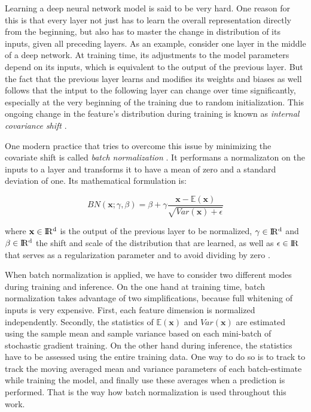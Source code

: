 Learning a deep neural network model is said to be very hard. One reason for this is that every layer not just has to learn the overall representation directly from the beginning, but also has to master the change in distribution of its inputs, given all preceding layers. As an example, consider one layer in the middle of a deep network. At training time, its adjustments to the model parameters depend on its inputs, which is equivalent to the output of the previous layer. But the fact that the previous layer learns and modifies its weights and biases as well follows that the intput to the following layer can change over time significantly, especially at the very beginning of the training due to random initialization. This ongoing change in the feature's distribution during training is known as \textit{internal covariance shift} \parencite{rnn-batchnorm}.

One modern practice that tries to overcome this issue by minimizing the covariate shift is called \textit{batch normalization} \parencite{batchnorm}. It performans a normalizaton on the inputs to a layer and transforms it to have a mean of zero and a standard deviation of one. Its mathematical formulation is:

\begin{equation} \label{eq:bn}
  BN(\textbf{x}; \gamma, \beta) = \beta + \gamma \frac{\textbf{x} - \mathbb{E}(\textbf{x})}{\sqrt{Var(\textbf{x}) + \epsilon}}
\end{equation}

where $ \textbf{x} \in \rm I\!R^d $ is the output of the previous layer to be normalized, $\gamma \in \rm I\!R^d $ and $\beta \in \rm I\!R^d $ the shift and scale of the distribution that are learned, as well as $\epsilon \in \rm I\!R $ that serves as a regularization parameter and to avoid dividing by zero \parencite{rnn-batchnorm}.

When batch normalization is applied, we have to consider two different modes during training and inference. On the one hand at training time, batch normalization takes advantage of two simplifications, because full whitening of inputs is very expensive. First, each feature dimension is normalized independently. Secondly, the statistics of $ \mathbb{E}(\textbf{x}) $ and $ Var(\textbf{x}) $ are estimated using the sample mean and sample variance based on each mini-batch of stochastic gradient training. On the other hand during inference, the statistics have to be assessed using the entire training data. One way to do so is to track to track the moving averaged mean and variance parameters of each batch-estimate while training the model, and finally use these averages when a prediction is performed. That is the way how batch normalization is used throughout this work.

